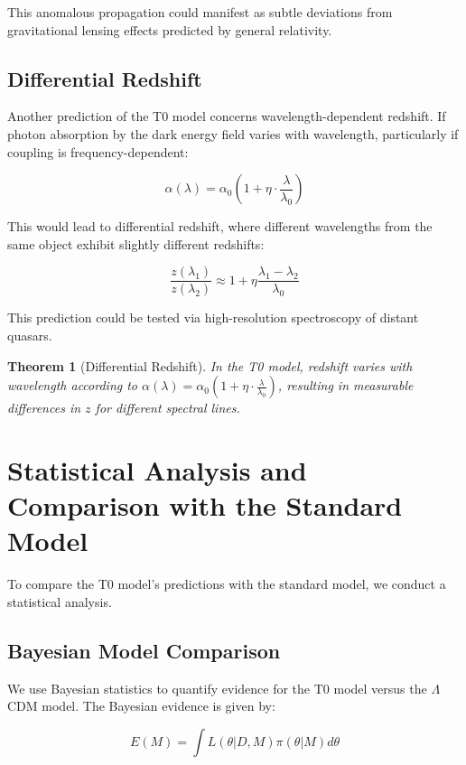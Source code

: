 \documentclass[a4paper,12pt]{article}
\newtheorem{theorem}{Theorem}[section]
\theoremstyle{definition}
\theoremstyle{remark}
\begin{document}
	This anomalous propagation could manifest as subtle deviations from gravitational lensing effects predicted by general relativity.
	
	\subsection{Differential Redshift}
	Another prediction of the T0 model concerns wavelength-dependent redshift. If photon absorption by the dark energy field varies with wavelength, particularly if coupling is frequency-dependent:
	
	\begin{equation}
		\alpha(\lambda) = \alpha_0 \left(1 + \eta \cdot \frac{\lambda}{\lambda_0}\right)
	\end{equation}
	
	This would lead to differential redshift, where different wavelengths from the same object exhibit slightly different redshifts:
	
	\begin{equation}
		\frac{z(\lambda_1)}{z(\lambda_2)} \approx 1 + \eta\frac{\lambda_1 - \lambda_2}{\lambda_0}
	\end{equation}
	
	This prediction could be tested via high-resolution spectroscopy of distant quasars.
	
	\begin{theorem}[Differential Redshift]
		In the T0 model, redshift varies with wavelength according to $\alpha(\lambda) = \alpha_0 \left(1 + \eta \cdot \frac{\lambda}{\lambda_0}\right)$, resulting in measurable differences in $z$ for different spectral lines.
	\end{theorem}
	
	\section{Statistical Analysis and Comparison with the Standard Model}
	To compare the T0 model’s predictions with the standard model, we conduct a statistical analysis.
	
	\subsection{Bayesian Model Comparison}
	We use Bayesian statistics to quantify evidence for the T0 model versus the $\Lambda$CDM model. The Bayesian evidence is given by:
	
	\begin{equation}
		E(M) = \int L(\theta|D,M) \pi(\theta|M) d\theta
	\end{equation}
	
\end{document}

